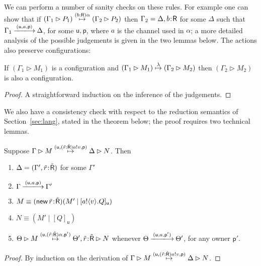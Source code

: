 \documentclass{LMCS}
\newcommand{\pfn}[1]{\mathsf{#1}}  \newcommand{\cfn}[1]{\mathsf{#1}}  \newcommand{\ownfnt}[1]{{\mathsf{#1}}}
\newcommand{\with}{\mathbin \rhd}
\newcommand{\cancom}[3]{({\ownfnt{#1}},{#2},{\ownfnt{#3}}) \xspace}
\newcommand{\typeletter}[1]{{\mathsf{#1}}}
\newcommand{\tR}{\typeletter{R}}
\newcommand{\pc}[1]{\langle#1\rangle}
\newcommand{\Cassoc}[2]{ {{#1}\kern -0.2em : \kern -0.2em {#2}}}
\newcommand{\Cnew}[2]{(\mathop{\pfn{new}} \Cassoc{#1}{#2})}
\newcommand{\Cpar}{\mathbin{|}}
\newcommand{\Cloc}[2]{[#1]_{\ownfnt{#2}}}
\newcommand{\ar}[1]{\mathbin{\xlongrightarrow{ #1}}}
\newcommand{\structeq}{\equiv}
\begin{document}
We can perform a number of sanity checks on these rules. For example
one can show that if $(\Gamma_1 \with P_1) \newar{(b:\tR)\alpha} (\Gamma_2 \with
P_2)$ then $\Gamma_2 = \Delta,\Cassoc{b}{\tR}$ for some $\Delta$ such 
that $\Gamma_1 \ar{\cancom{u}{a}{p}} \Delta$, for some $\ownfnt u, \ownfnt p$, 
where $a$ is the channel used in $\alpha$; a more detailed analysis of the possible
judgements is given in the two lemmas below.
The actions also preserve configurations:
\begin{prop}
    If $(\Gamma_1 \with M_1)$ is a configuration and 
$(\Gamma_1 \with M_1) \newar{\lambda} (\Gamma_2 \with M_2)$ 
then $(\Gamma_2 \with M_2)$ is also a configuration. 
\end{prop}
\begin{proof}
  A straightforward induction on the inference of the judgements.
\end{proof}
We also have a consistency check with respect to the reduction semantics
of Section~\ref{sec:lang}, stated in the theorem below; the proof requires
two technical lemmas. 
\begin{lem}\label{lemma:derout1}
  Suppose $\Gamma \with M \newar{\cancom{u}{(\tilde{r}:\tilde{\tR})a!v}{p}} \Delta \with N$.
Then
\begin{enumerate}[\em(i)]
\item $\Delta = (\Gamma', \Cassoc{\tilde{r}}{\tilde{\tR}})$ for some $\Gamma'$
\item $\Gamma \ar{\cancom{u}{a}{p}} \Gamma'$ \item $ M \structeq \Cnew{\tilde{r}}{\tilde{\tR}} (M' \Cpar \Cloc{a!\pc{v}. Q}{u})$
\item $ N \structeq  (M' \Cpar \Cloc{ Q}{u})$
\item  $\Theta \with M \newar{\cancom{u}{(\tilde{r}:\tilde{\tR})\alpha}{p'}} 
        \Theta',  \Cassoc{\tilde{r}}{\tilde{\tR}} \with N$ 
whenever
$\Theta \ar{\cancom{u}{a}{p'}} \Theta'$, for any owner $\ownfnt p'$.
\end{enumerate}
\end{lem}
\begin{proof}
  By induction on the derivation of 
   $\Gamma \with M \newar{\cancom{u}{(\tilde{r}:\tilde{\tR})a!v}{p}} \Delta \with N$.
\end{proof}
\end{document}
